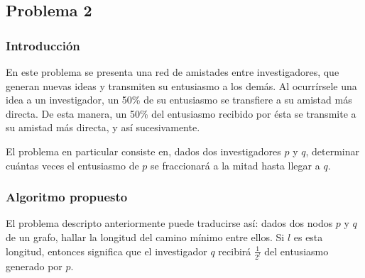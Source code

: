 \documentclass[12pt, a4paper,english,spanish]{article}
\begin{document}
\newpage


\subsection*{Problema 2}
\subsubsection*{Introducci\'on}
En este problema se presenta una red de amistades entre investigadores, que generan nuevas ideas y transmiten su entusiasmo a los dem\'as. Al ocurr\'irsele una idea a un investigador, un 50\% de su entusiasmo se transfiere a su amistad m\'as directa. De esta manera, un 50\% del entusiasmo recibido por \'esta se transmite a su amistad m\'as directa, y as\'i sucesivamente.

El problema en particular consiste en, dados dos investigadores $p$ y $q$, determinar cu\'antas veces el entusiasmo de $p$ se fraccionar\'a a la mitad hasta llegar a $q$. 

\subsubsection*{Algoritmo propuesto}
El problema descripto anteriormente puede traducirse as\'i: dados dos nodos $p$ y $q$ de un grafo, hallar la longitud del camino m\'inimo entre ellos. Si $l$ es esta longitud, entonces significa que el investigador $q$ recibir\'a $\frac{1}{2^l}$ del entusiasmo generado por $p$.
\\
\end{document}
